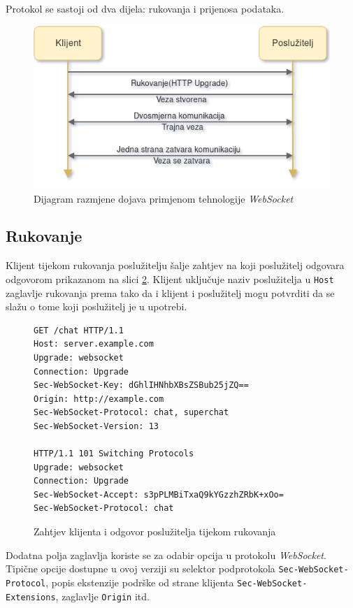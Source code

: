 \documentclass[times, utf8, zavrsni]{fer}
\begin{document}
{Protokol se sastoji od dva dijela: rukovanja  i prijenosa podataka. \citep{rfc6455}

\begin{figure}[htb]
\centering
\includegraphics[width=12cm]{img/websocket.png}
\caption{Dijagram razmjene dojava primjenom tehnologije {\em WebSocket}}
\label{fig:websocket-image}
\end{figure}

\subsection{Rukovanje}
Klijent tijekom rukovanja poslužitelju šalje zahtjev na koji poslužitelj odgovara odgovorom prikazanom na slici \ref{lst:websocket-rukovanje}. Klijent uključuje naziv poslužitelja u {\tt Host} zaglavlje rukovanja prema tako da i klijent i poslužitelj mogu potvrditi da se slažu o tome koji poslužitelj je u upotrebi.

\begin{figure}[htb]
\begin{lstlisting}
GET /chat HTTP/1.1
Host: server.example.com
Upgrade: websocket
Connection: Upgrade
Sec-WebSocket-Key: dGhlIHNhbXBsZSBub25jZQ==
Origin: http://example.com
Sec-WebSocket-Protocol: chat, superchat
Sec-WebSocket-Version: 13

HTTP/1.1 101 Switching Protocols
Upgrade: websocket
Connection: Upgrade
Sec-WebSocket-Accept: s3pPLMBiTxaQ9kYGzzhZRbK+xOo=
Sec-WebSocket-Protocol: chat
\end{lstlisting}
\caption{Zahtjev klijenta i odgovor poslužitelja  tijekom rukovanja}
\label{lst:websocket-rukovanje}
\end{figure}

Dodatna polja zaglavlja koriste se za odabir opcija u protokolu {\em WebSocket}. Tipične opcije dostupne u ovoj verziji su selektor podprotokola {\tt Sec-WebSocket-Protocol}, popis ekstenzije podrške od strane klijenta {\tt Sec-WebSocket-Extensions}, zaglavlje {\tt Origin} itd. 

}
\end{document}
